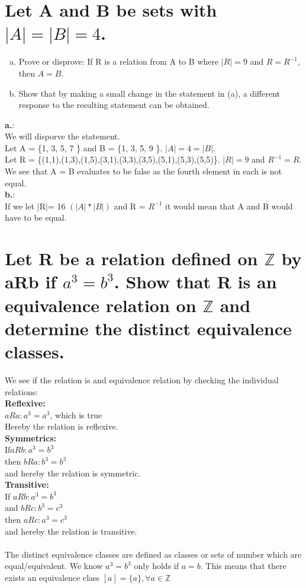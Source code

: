 \section{Let A and B be sets with $|A|=|B|=4$.}
\begin{enumerate}[a.]
\item Prove or disprove: If R is a relation from A to B where $|R|=9$ and $R = R^{-1}$, then $A=B$.
\item Show that by making a small change in the statement in (a), a different response to the resulting statement can be obtained.
\end{enumerate}
\textbf{a.}:\\
We will disporve the statement.\\
Let A = \{1, 3, 5, 7 \} and B = \{1, 3, 5, 9 \}.  $|A| = 4 = |B|$.\\
Let R = \{(1,1),(1,3),(1,5),(3,1),(3,3),(3,5),(5,1),(5,3),(5,5)\}. $|R|=9$ and $R^{-1} = R$.\\
We see that A = B evaluates to be false as the fourth element in each is not equal.\\
\textbf{b.}:\\
If we let |R|= 16 $(|A| * |B|)$ and R = $R^{-1}$ it would mean that A and B would have to be equal.
\newpage
\section{Let R be a relation defined on $\mathbb{Z}$ by aRb if $a^3 = b^3$. Show that R is an equivalence relation on $\mathbb{Z}$ and determine the distinct equivalence classes.}
We see if the relation is and equivalence relation by checking the individual relations:\\
\textbf{Reflexive:}\\
$aRa: a^3=a^3$, which is true\\ 
Hereby the relation is reflexive.\\
\textbf{Symmetrics:}\\
If$aRb: a^3=b^3$\\
then $bRa: b^3=b^3$\\
and hereby the relation is symmetric.\\
\textbf{Transitive:}\\
If $aRb: a^3=b^3$\\
and $bRc: b^3=c^3$\\
then $aRc: a^3=c^3$\\
and hereby the relation is transitive.\\
\\
The distinct equivalence classes are defined as classes or sets of number which are equal/equivalent. We know $a^3=b^3$ only holds if $a=b$. This means that there exists an equivalence class $[a]=\{a\},  \forall a \in \mathbb{Z}$

